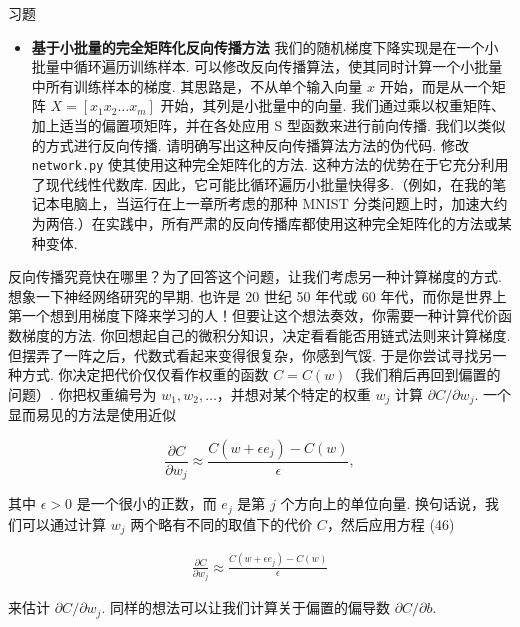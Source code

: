 \begin{exerciseBox}{习题}

\begin{itemize}

\item \textbf{基于小批量的完全矩阵化反向传播方法} 我们的随机梯度下降实现是在一个小批量中循环遍历训练样本. 可以修改反向传播算法，使其同时计算一个小批量中所有训练样本的梯度. 其思路是，不从单个输入向量 $x$ 开始，而是从一个矩阵 $X = [x_1 x_2 \ldots x_m]$ 开始，其列是小批量中的向量. 我们通过乘以权重矩阵、加上适当的偏置项矩阵，并在各处应用 S 型函数来进行前向传播. 我们以类似的方式进行反向传播. 请明确写出这种反向传播算法方法的伪代码. 修改 \texttt{network.py} 使其使用这种完全矩阵化的方法. 这种方法的优势在于它充分利用了现代线性代数库. 因此，它可能比循环遍历小批量快得多.（例如，在我的笔记本电脑上，当运行在上一章所考虑的那种 MNIST 分类问题上时，加速大约为两倍.）在实践中，所有严肃的反向传播库都使用这种完全矩阵化的方法或某种变体.

\end{itemize}

\end{exerciseBox}

反向传播究竟快在哪里？为了回答这个问题，让我们考虑另一种计算梯度的方式. 想象一下神经网络研究的早期. 也许是 20 世纪 50 年代或 60 年代，而你是世界上第一个想到用梯度下降来学习的人！但要让这个想法奏效，你需要一种计算代价函数梯度的方法. 你回想起自己的微积分知识，决定看看能否用链式法则来计算梯度. 但摆弄了一阵之后，代数式看起来变得很复杂，你感到气馁. 于是你尝试寻找另一种方式. 你决定把代价仅仅看作权重的函数 $C = C(w)$（我们稍后再回到偏置的问题）. 你把权重编号为 $w_1, w_2, \ldots$，并想对某个特定的权重 $w_j$ 计算 $\partial C / \partial w_j$. 一个显而易见的方法是使用近似

\begin{equation}
\frac{\partial C}{\partial w_{j}} \approx \frac{C(w+\epsilon e_j)-C(w)}{\epsilon},
\tag{46}
\end{equation}

\noindent 其中 $\epsilon > 0$ 是一个很小的正数，而 $e_j$ 是第 $j$ 个方向上的单位向量. 换句话说，我们可以通过计算 $w_j$ 两个略有不同的取值下的代价 $C$，然后应用方程 (46)

\begin{align*}
\frac{\partial C}{\partial w_{j}} \approx \frac{C(w+\epsilon e_j)-C(w)}{\epsilon} \nonumber
\end{align*}

\noindent 来估计 $\partial C / \partial w_j$. 同样的想法可以让我们计算关于偏置的偏导数 $\partial C / \partial b$.

